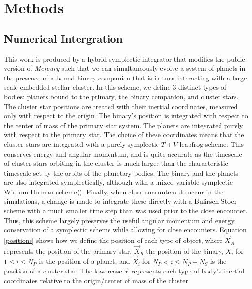 \documentclass[manuscript]{aastex631}
\begin{document}
\section{Methods}
\subsection{Numerical Intergration}
This work is produced by a hybrid symplectic integrator that modifies the public version of \textit{Mercury} such that we can simultaneously evolve a system of planets
in the presence of a bound binary companion that is in turn interacting with a large scale embedded stellar cluster.
In this scheme, we define 3 distinct types of bodies: planets 
bound to the primary, the binary companion, and cluster stars. The cluster star positions are treated with their inertial coordinates,
measured only with respect to the origin. The binary's position
is integrated with respect to the center of mass of the primary star system. 
The planets are integrated purely with respect to the primary star.
The choice of these coordinates means that the cluster stars are integrated with a purely symplectic $T+V$ leapfrog scheme. This
conserves energy and angular momentum, and is quite accurate as the timescale of cluster stars orbiting in the cluster
is much larger than the characteristic timescale set by the orbits of the planetary bodies. The binary and the planets 
are also integrated symplectically, although with a mixed variable symplectic Wisdom-Holman scheme(\cite{wis91}). Finally, when close encounters do occur in the simulations,
a change is made to integrate these directly with a Bulirsch-Stoer scheme with a much smaller time step than was used prior to the close
encounter. Thus, this scheme largely preserves the useful angular momentum and energy conservation of a symplectic scheme while allowing
for close encounters.
Equation \ref{positions} shows how we define the position of each type of object, where $\vec{X}_A$ represents the position of the primary star,
$\vec{X}_B$ the position of the binary, $X_{i}$ for $1\leq i \leq N_P$ is the position of a planet, and $\vec{X}_i$ for $N_P < i \leq N_P+N_S$ is the position of a cluster star.
The lowercase $\vec{x}$ represents each type of body's inertial coordinates relative to the origin/center of mass of the cluster.
\end{document}
